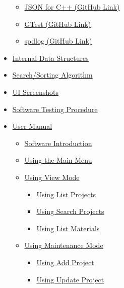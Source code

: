 \documentclass[
  english,
  a4paper,
,tablecaptionabove
]{scrartcl}
\providecommand{\tightlist}{%
  \setlength{\itemsep}{0pt}\setlength{\parskip}{0pt}}
\begin{document}
\begin{itemize}
  \begin{itemize}
  \tightlist
  \item
    \protect\hyperlink{json-for-c-github-link}{JSON for C++ (GitHub
    Link)}
  \item
    \protect\hyperlink{gtest-github-link}{GTest (GitHub Link)}
  \item
    \protect\hyperlink{spdlog-github-link}{spdlog (GitHub Link)}
  \end{itemize}
\item
  \protect\hyperlink{internal-data-structures}{Internal Data Structures}
\item
  \protect\hyperlink{searchsorting-algorithm}{Search/Sorting Algorithm}
\item
  \protect\hyperlink{ui-screenshots}{UI Screenshots}
\item
  \protect\hyperlink{software-testing-procedure}{Software Testing
  Procedure}
\item
  \protect\hyperlink{user-manual}{User Manual}

  \begin{itemize}
  \tightlist
  \item
    \protect\hyperlink{software-introduction}{Software Introduction}
  \item
    \protect\hyperlink{using-the-main-menu}{Using the Main Menu}
  \item
    \protect\hyperlink{using-view-mode}{Using View Mode}

    \begin{itemize}
    \tightlist
    \item
      \protect\hyperlink{using-list-projects}{Using List Projects}
    \item
      \protect\hyperlink{using-search-projects}{Using Search Projects}
    \item
      \protect\hyperlink{using-list-materials}{Using List Materials}
    \end{itemize}
  \item
    \protect\hyperlink{using-maintenance-mode}{Using Maintenance Mode}

    \begin{itemize}
    \tightlist
    \item
      \protect\hyperlink{using-add-project}{Using Add Project}
    \item
      \protect\hyperlink{using-update-project}{Using Update Project}


\end{itemize}
\end{itemize}
\end{itemize}
\end{document}
